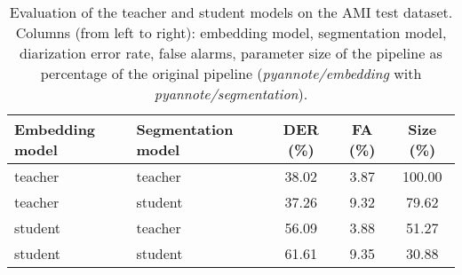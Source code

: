 \begin{table}
\caption{Evaluation of the teacher and student models on the AMI test dataset. Columns (from left to right): embedding model, segmentation model, diarization error rate, false alarms, parameter size of the pipeline as percentage of the original pipeline (\textit{pyannote/embedding} with \textit{pyannote/segmentation}). \newline}
\label{tab:evaluation}{\scriptsize 
\begin{tabular}{llccc}
\toprule
Embedding model & Segmentation model & DER (\%) & FA (\%) & Size (\%) \\
\midrule
teacher & teacher & 38.02 & 3.87 & 100.00 \\
teacher & student & 37.26 & 9.32 & 79.62 \\
student & teacher & 56.09 & 3.88 & 51.27 \\
student & student & 61.61 & 9.35 & 30.88 \\
\bottomrule
\end{tabular}
}\end{table}
